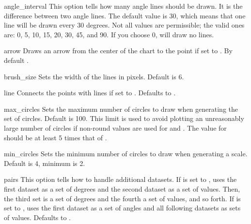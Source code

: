 \constructorblurb{\thisname}

\begin{AttrDecl}{angle\_interval}
This option tells \thisclass how many angle lines should be drawn. It is
the difference between two angle lines. The default value is 30, which
means that one line will be drawn every 30 degrees. Not all values are
permissible; the valid ones are: 0, 5, 10, 15, 20, 30, 45, and 90. If
you choose 0, \thisclass will draw no lines.
\end{AttrDecl}

\begin{AttrDecl}{arrow}
Draws an arrow from the center of the chart to the point if set to
. By default .
\end{AttrDecl}

\begin{AttrDecl}{brush\_size}
Sets the width of the lines in pixels. Default is 6.
\end{AttrDecl}

\begin{AttrDecl}{line}
Connects the points with lines if set to . Defaults to
.
\end{AttrDecl}

\begin{AttrDecl}{max\_circles}
Sets the maximum number of circles to draw when generating the set of
circles. Default is 100. This limit is used to avoid plotting an
unreasonably large number of circles if non-round values are used for
 and . The value for
 should be at least 5 times that of
.
\end{AttrDecl}

\begin{AttrDecl}{min\_circles}
Sets the minimum number of circles to draw when generating a scale.
Default is 4, minimum is 2.
\end{AttrDecl}

\begin{AttrDecl}{pairs}
This option tells \thisclass how to handle additional datasets. If
 is set to , \thisclass uses the first
dataset as a set of degrees and the second dataset as a set of values.
Then, the third set is a set of degrees and the fourth a set of values,
and so forth. If  is set to , \thisclass
uses the first dataset as a set of angles and all following datasets as
sets of values. Defaults to .
\end{AttrDecl}

